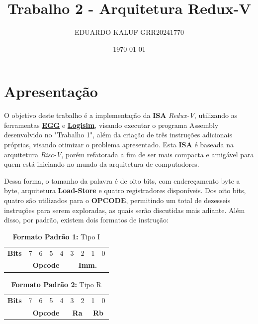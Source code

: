 \documentclass{article}  %
\title{Trabalho 2 - Arquitetura Redux-V}
\author{EDUARDO KALUF GRR20241770}
\date{\today}
\begin{document}
    \maketitle
    
    \section{Apresentação}
    
    \setlength{\parindent}{15pt}

    O objetivo deste trabalho é a implementação da \textbf{ISA} \textit{Redux-V}, utilizando as ferramentas \href{https://github.com/gboncoffee/egg}{\textbf{EGG}} e \href{https://github.com/logisim-evolution/logisim-evolution}{\textbf{Logisim}}, visando executar o programa Assembly desenvolvido no "Trabalho 1", além da criação de três instruções adicionais próprias, visando otimizar o problema apresentado.
    Esta \textbf{ISA} é baseada na arquitetura \textit{Risc-V}, porém refatorada a fim de ser mais compacta e amigável para quem está iniciando no mundo da arquitetura de computadores.
    
    Dessa forma, o tamanho da palavra é de oito bits, com endereçamento byte a byte, arquitetura \textbf{Load-Store} e quatro registradores disponíveis.
    Dos oito bits, quatro são utilizados para o \textbf{OPCODE}, permitindo um total de dezesseis instruções para serem exploradas, as quais serão discutidas mais adiante. Além disso, por padrão, existem dois formatos de instrução:

    \begin{table}[h]
      \captionsetup{labelformat=empty, skip=0pt}
      \caption{\textbf{Formato Padrão 1:} Tipo I}
      \centering
      \begin{tabular}{|c|*{8}{c|}}
        \hline
        \rowcolor{green!50}
        \multicolumn{9}{|c|}{\textbf{Tipo I}} \\ \hline
        \textbf{Bits} & 7 & 6 & 5 & 4 & 3 & 2 & 1 & 0 \\ \hline
        & \multicolumn{4}{c|}{\textbf{Opcode}} & \multicolumn{4}{c|}{\textbf{Imm.}} \\ \hline
      \end{tabular}
    \end{table}

    \begin{table}[h]
      \captionsetup{labelformat=empty, skip=0pt}
      \caption{\textbf{Formato Padrão 2:} Tipo R}
      \centering
      \begin{tabular}{|c|*{8}{c|}}
        \hline
        \rowcolor{blue!50}
        \multicolumn{9}{|c|}{\textbf{Tipo R}} \\ \hline
        \textbf{Bits} & 7 & 6 & 5 & 4 & 3 & 2 & 1 & 0 \\ \hline
        & \multicolumn{4}{c|}{\textbf{Opcode}} & \multicolumn{2}{c|}{\textbf{Ra}} & \multicolumn{2}{c|}{\textbf{Rb}} \\ \hline
      \end{tabular}
    \end{table}
\end{document}
